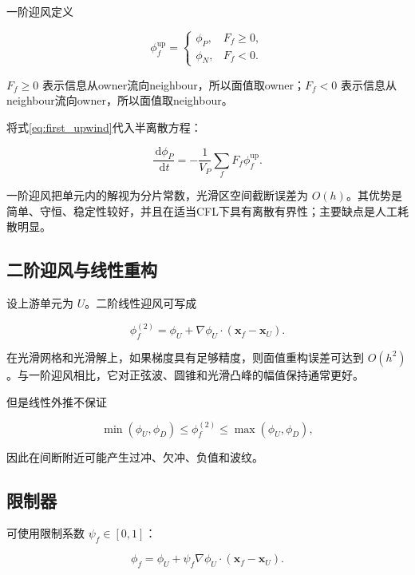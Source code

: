 \documentclass[UTF8,12pt,a4paper,fontset=fandol]{ctexart}
\numberwithin{equation}{section}
\newcommand{\dd}{\,\mathrm d}
\newcommand{\xf}{\bm x}
\begin{document}
一阶迎风定义

\begin{equation}
  \phi_f^{\mathrm{up}}
  =
  \begin{cases}
  \phi_P,&F_f\geq0,\\
  \phi_N,&F_f<0.
  \end{cases}
  \label{eq:first_upwind}
\end{equation}

$F_f\geq0$ 表示信息从owner流向neighbour，所以面值取owner；$F_f<0$ 表示信息从neighbour流向owner，所以面值取neighbour。

将式\eqref{eq:first_upwind}代入半离散方程：

\begin{equation}
  \frac{\dd\phi_P}{\dd t}
  =
  -\frac1{V_P}
  \sum_fF_f\phi_f^{\mathrm{up}}.
  \label{eq:upwind_semidiscrete}
\end{equation}

一阶迎风把单元内的解视为分片常数，光滑区空间截断误差为 $O(h)$。其优势是简单、守恒、稳定性较好，并且在适当CFL下具有离散有界性；主要缺点是人工耗散明显。

\subsection{二阶迎风与线性重构}

设上游单元为 $U$。二阶线性迎风可写成

\begin{equation}
  \phi_f^{(2)}
  =
  \phi_U
  +
  \nabla\phi_U\cdot(\xf_f-\xf_U).
  \label{eq:linear_upwind}
\end{equation}

在光滑网格和光滑解上，如果梯度具有足够精度，则面值重构误差可达到 $O(h^2)$。与一阶迎风相比，它对正弦波、圆锥和光滑凸峰的幅值保持通常更好。

但是线性外推不保证

\begin{equation}
  \min(\phi_U,\phi_D)
  \leq
  \phi_f^{(2)}
  \leq
  \max(\phi_U,\phi_D),
\end{equation}

因此在间断附近可能产生过冲、欠冲、负值和波纹。

\subsection{限制器}

可使用限制系数 $\psi_f\in[0,1]$：

\begin{equation}
  \phi_f
  =
  \phi_U
  +
  \psi_f
  \nabla\phi_U\cdot(\xf_f-\xf_U).
\end{equation}
\end{document}
